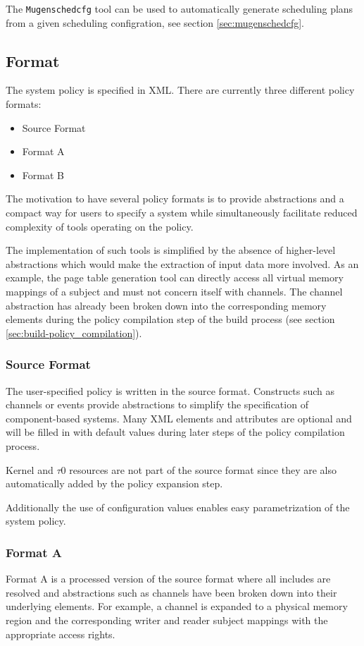 \documentclass[a4paper,twoside,titlepage]{article}
\begin{document}
The \texttt{Mugenschedcfg} tool can be used to automatically generate
scheduling plans from a given scheduling configration, see section
\ref{sec:mugenschedcfg}.

\subsection{Format}
The system policy is specified in XML. There are currently three different
policy formats:

\begin{itemize}
	\item Source Format
	\item Format A
	\item Format B
\end{itemize}

The motivation to have several policy formats is to provide abstractions and a
compact way for users to specify a system while simultaneously facilitate
reduced complexity of tools operating on the policy.

The implementation of such tools is simplified by the absence of higher-level
abstractions which would make the extraction of input data more involved. As
an example, the page table generation tool can directly access all virtual
memory mappings of a subject and must not concern itself with channels. The
channel abstraction has already been broken down into the corresponding memory
elements during the policy compilation step of the build process (see
section \ref{sec:build-policy_compilation}).

\subsubsection{Source Format}
The user-specified policy is written in the source format. Constructs such as
channels or events provide abstractions to simplify the specification of
component-based systems. Many XML elements and attributes are optional and will
be filled in with default values during later steps of the policy compilation
process.

Kernel and $\tau$0 resources are not part of the source format since they are also
automatically added by the policy expansion step.

Additionally the use of configuration values enables easy parametrization of
the system policy.

\subsubsection{Format A}
Format A is a processed version of the source format where all includes are
resolved and abstractions such as channels have been broken down into their
underlying elements. For example, a channel is expanded to a physical memory
region and the corresponding writer and reader subject mappings with the
appropriate access rights.
\end{document}
